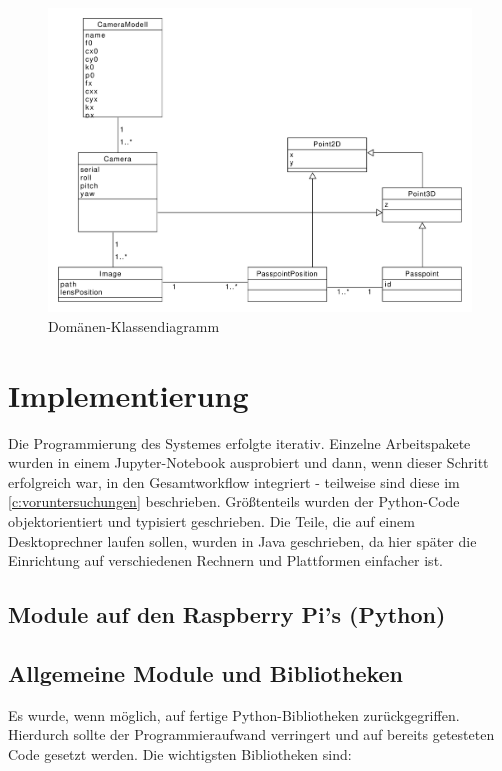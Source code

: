 \documentclass[./00PhotoBox.tex]{subfiles}
\begin{document}
\begin{figure}
    \centering
    \includegraphics[width=1\textwidth]{./img/uml/uml_domain.pdf}
    \centering
    \caption{Domänen-Klassendiagramm} %
    \label{img:dokladia} %
\end{figure}

\section{Implementierung}
\label{sec:Implementierung}


Die Programmierung des Systemes erfolgte iterativ. Einzelne Arbeitspakete wurden in einem Jupyter-Notebook ausprobiert und dann, wenn dieser Schritt erfolgreich war, in den Gesamtworkflow integriert - teilweise sind diese im \autoref{c:voruntersuchungen} beschrieben. Größtenteils wurden der Python-Code objektorientiert und typisiert geschrieben. Die Teile, die auf einem Desktoprechner laufen sollen, wurden in Java geschrieben, da hier später die Einrichtung auf verschiedenen Rechnern und Plattformen einfacher ist.

\subsection{Module auf den Raspberry Pi's (Python)}

\subsection{Allgemeine Module und Bibliotheken}
Es wurde, wenn möglich, auf fertige Python-Bibliotheken zurückgegriffen. Hierdurch sollte der Programmieraufwand verringert und auf bereits getesteten Code gesetzt werden. Die wichtigsten Bibliotheken sind:
\end{document}
